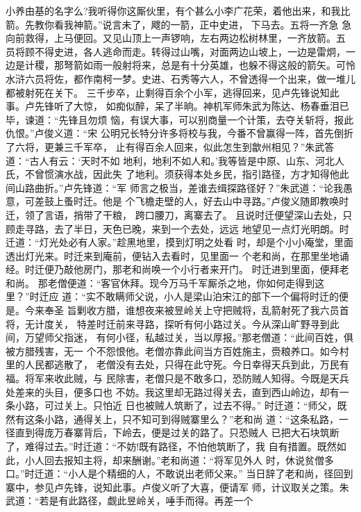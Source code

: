 小养由基的名字么?我听得你这厮伙里，有个甚么小李广花荣，着他出来，和我比
箭。先教你看我神箭。”说言未了，飕的一箭，正中史进，下马去。五将一齐急
急向前救得，上马便回。又见山顶上一声锣响，左右两边松树林里，一齐放箭。五
员将顾不得史进，各人逃命而走。转得过山嘴，对面两边山坡上，一边是雷炯，一
边是计稷，那弩箭如雨一般射将来，总是有十分英雄，也躲不得这般的箭矢。可怜
水浒六员将佐，都作南柯一梦。史进、石秀等六人，不曾透得一个出来，做一堆儿
都被射死在关下。
三千步卒，止剩得百余个小军，逃得回来，见卢先锋说知此事。卢先锋听了大惊，
如痴似醉，呆了半晌。神机军师朱武为陈达、杨春垂泪已毕，谏道：“先锋且勿烦
恼，有误大事，可以别商量一个计策，去夺关斩将，报此仇恨。”卢俊义道：“宋
公明兄长特分许多将校与我，今番不曾赢得一阵，首先倒折了六将，更兼三千军卒，
止有得百余人回来，似此怎生到歙州相见？”朱武答道：“古人有云：‘天时不如
地利，地利不如人和。’我等皆是中原、山东、河北人氏，不曾惯演水战，因此失
了地利。须获得本处乡民，指引路径，方才知得他此间山路曲折。”卢先锋道：“军
师言之极当，差谁去缉探路径好？”朱武道：“论我愚意，可差鼓上蚤时迁。他是
个飞檐走壁的人，好去山中寻路。”卢俊义随即教唤时迁，领了言语，捎带了干粮，
跨口腰刀，离寨去了。
且说时迁便望深山去处，只顾走寻路，去了半日，天色已晚，来到一个去处，远远
地望见一点灯光明朗。时迁道：“灯光处必有人家。”趁黑地里，摸到灯明之处看
时，却是个小小庵堂，里面透出灯光来。时迁来到庵前，便钻入去看时，见里面一
个老和尚，在那里坐地诵经。时迁便乃敲他房门，那老和尚唤一个小行者来开门。
时迁进到里面，便拜老和尚。
那老僧便道：“客官休拜。现今万马千军厮杀之地，你如何走得到这里？”时迁应
道：“实不敢瞒师父说，小人是梁山泊宋江的部下一个偏将时迁的便是。今来奉圣
旨剿收方腊，谁想夜来被昱岭关上守把贼将，乱箭射死了我六员首将，无计度关，
特差时迁前来寻路，探听有何小路过关。今从深山旷野寻到此间，万望师父指迷，
有何小径，私越过关，当以厚报。”那老僧道：“此间百姓，俱被方腊残害，无一
个不怨恨他。老僧亦靠此间当方百姓施主，赍粮养口。如今村里的人民都逃散了，
老僧没有去处，只得在此守死。今日幸得天兵到此，万民有福。将军来收此贼，与
民除害，老僧只是不敢多口，恐防贼人知得。今既是天兵处差来的头目，便多口也
不妨。我这里却无路过得关去，直到西山岭边，却有一条小路，可过关上。只怕近
日也被贼人筑断了，过去不得。”
时迁道：“师父，既然有这条小路，通得关上，只不知可到得贼寨里么？”老和尚
道：“这条私路，一径直到得庞万春寨背后，下岭去，便是过关的路了。只恐贼人
已把大石块筑断了，难得过去。”时迁道：“不妨!既有路径，不怕他筑断了，我
自有措置。既然如此，小人回去报知主将，却来酬谢。”老和尚道：“将军见外人
时，休说贫僧多口。”时迁道：“小人是个精细的人，不敢说出老师父来。”
当日辞了老和尚，径回到寨中，参见卢先锋，说知此事。卢俊义听了大喜，便请军
师，计议取关之策。朱武道：“若是有此路径，觑此昱岭关，唾手而得。再差一个
